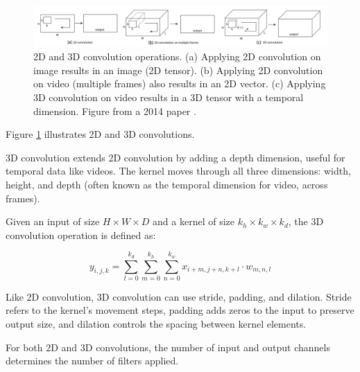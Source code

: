 \begin{figure}
    \centering
    \includegraphics[width=1\textwidth]{images/appendix/blocks/3d_conv.png}
    \caption{2D and 3D convolution operations. (a) Applying 2D convolution on image results in an image (2D tensor). (b) Applying 2D convolution on video (multiple frames) also results in an 2D vector. (c) Applying 3D convolution on video results in a 3D tensor with a temporal dimension. Figure from a 2014 paper \cite{tran2015learning}.}
    \label{fig:appendix_blocks_3dconv}
\end{figure}

Figure \ref{fig:appendix_blocks_3dconv} illustrates 2D and 3D convolutions.

3D convolution extends 2D convolution by adding a depth dimension, useful for temporal data like videos. The kernel moves through all three dimensions: width, height, and depth (often known as the temporal dimension for video, across frames).

Given an input of size $H \times W \times D$ and a kernel of size $k_h \times k_w \times k_d$, the 3D convolution operation is defined as:

\begin{equation*}
    y_{i,j,k} = \sum_{l=0}^{k_d} \sum_{m=0}^{k_h} \sum_{n=0}^{k_w} x_{i+m,j+n,k+l} \cdot w_{m,n,l}
\end{equation*}

Like 2D convolution, 3D convolution can use stride, padding, and dilation. Stride refers to the kernel's movement steps, padding adds zeros to the input to preserve output size, and dilation controls the spacing between kernel elements.

For both 2D and 3D convolutions, the number of input and output channels determines the number of filters applied.
